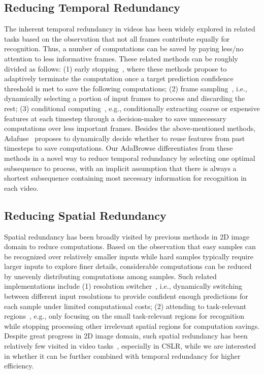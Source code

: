 \documentclass[sigconf]{acmart}
\begin{document}
\subsection{Reducing Temporal Redundancy}
The inherent temporal redundancy in videos has been widely explored in related tasks based on the observation that not all frames contribute equally for recognition. Thus, a number of computations can be saved by paying less/no attention to less informative frames. These related methods can be roughly divided as follows: (1) early stopping~\cite{ghodrati2021frameexit,fan2018watching}, where these methods propose to adaptively terminate the computation once a target prediction confidence threshold is met to save the following computations; (2) frame sampling~\cite{wang2021adaptive,wu2019multi,gao2020listen,korbar2019scsampler,wu2020dynamic}, i.e., dynamically selecting a portion of input frames to process and discarding the rest; (3) conditional computing~\cite{wu2019liteeval,meng2020ar}, e.g., conditionally extracting coarse or expensive features at each timestep through a decision-maker to save unnecessary computations over less important frames. Besides the above-mentioned methods, Adafuse~\cite{meng2021adafuse} proposes to dynamically decide whether to reuse features from past timesteps to save computations. Our AdaBrowse differentiates from these methods in a novel way to reduce temporal redundancy by selecting one optimal subsequence to process, with an implicit assumption that there is always a shortest subsequence containing most necessary information for recognition in each video.
  
\subsection{Reducing Spatial Redundancy}
Spatial redundancy has been broadly visited by previous methods in 2D image domain to reduce computations. Based on the observation that easy samples can be recognized over relatively smaller inputs while hard samples typically require larger inputs to explore finer details, considerable computations can be reduced by unevenly distributing computations among samples. Such related implementations include (1) resolution switcher~\cite{yang2020resolution,meng2020ar,DBLP:conf/nips/ZhuHWZNLW21}, i.e., dynamically switching between different input resolutions to provide confident enough predictions for each sample under limited computational costs; (2) attending to task-relevant regions~\cite{xie2020spatially,wang2020glance,figurnov2017spatially}, e.g., only focusing on the small task-relevant regions for recognition while stopping processing other irrelevant spatial regions for computation savings. Despite great progress in 2D image domain, such spatial redundancy has been relatively few visited in video tasks~\cite{wang2021adaptive,meng2020ar}, especially in CSLR, while we are interested in whether it can be further combined with temporal redundancy for higher efficiency. 
  
\end{document}
